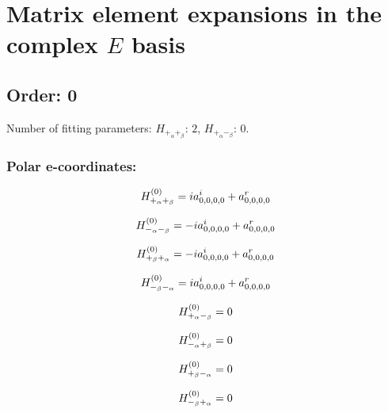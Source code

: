 \documentclass[fleqn]{article}
\begin{document}
\section{Matrix element expansions in the complex $E$ basis}
\subsection{Order: 0}
Number of fitting parameters: $H_{+_{\alpha}+_{\beta}}$: $2$, $H_{+_{\alpha}-_{\beta}}$: $0$.
\subsubsection*{Polar e-coordinates:}

\begin{dmath*}
H_{+_{\alpha}+_{\beta}}^{(0)}= i a^{i}_{0,0,0,0} + a^{r}_{0,0,0,0}\\
\end{dmath*}

\begin{dmath*}
H_{-_{\alpha}-_{\beta}}^{(0)}=-  i a^{i}_{0,0,0,0} + a^{r}_{0,0,0,0}\\
\end{dmath*}

\begin{dmath*}
H_{+_{\beta}+_{\alpha}}^{(0)}=-  i a^{i}_{0,0,0,0} + a^{r}_{0,0,0,0}\\
\end{dmath*}

\begin{dmath*}
H_{-_{\beta}-_{\alpha}}^{(0)}= i a^{i}_{0,0,0,0} + a^{r}_{0,0,0,0}\\
\end{dmath*}

\begin{dmath*}
H_{+_{\alpha}-_{\beta}}^{(0)}=0\\
\end{dmath*}

\begin{dmath*}
H_{-_{\alpha}+_{\beta}}^{(0)}=0\\
\end{dmath*}

\begin{dmath*}
H_{+_{\beta}-_{\alpha}}^{(0)}=0\\
\end{dmath*}

\begin{dmath*}
H_{-_{\beta}+_{\alpha}}^{(0)}=0\\
\end{dmath*}
\end{document}

